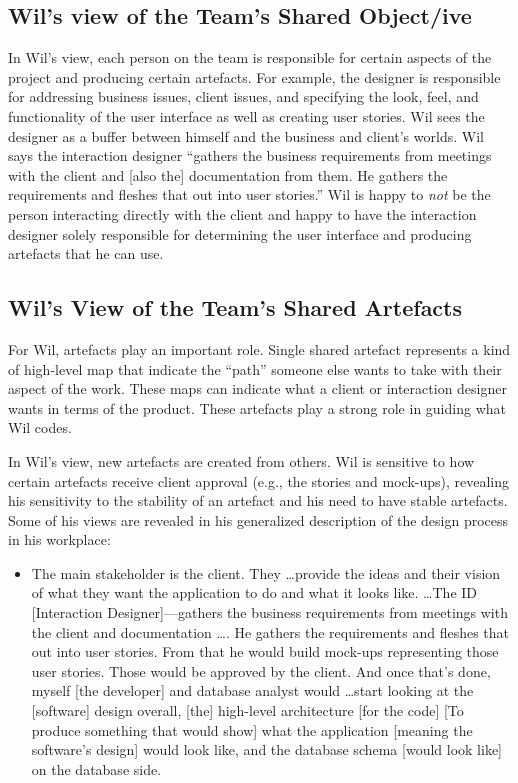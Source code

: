 \documentclass{chi2009}
\begin{document}
\subsection{Wil's view of the Team's Shared Object/ive} 
In Wil's view, each person on the team is responsible for certain aspects of the project and producing certain artefacts.  For example, the designer is responsible for addressing business issues, client issues, and specifying the look, feel, and functionality of the user interface as well as creating user stories. Wil sees the designer as a buffer between himself and the business and client's worlds. Wil says the interaction designer ``gathers the business requirements from meetings with the client and [also the] documentation from them. He gathers the requirements and fleshes that out into user stories.'' Wil is happy to {\it not} be the person interacting directly with the client and happy to have the interaction designer solely responsible for determining the user interface and producing artefacts that he can use. 

\subsection{Wil's View of the Team's Shared Artefacts} 
For Wil, artefacts play an important role. Single shared artefact represents a kind of high-level map that indicate the ``path'' someone else wants to take with their aspect of the work. These maps can indicate what a client or interaction designer wants in terms of the product. These artefacts play a strong role in guiding what Wil codes.  

In Wil's view, new artefacts are created from others. Wil is sensitive to how certain artefacts receive client approval (e.g., the stories and mock-ups), revealing his sensitivity to the stability of an artefact and his need to have stable artefacts. Some of his views are revealed in his generalized description of the design process in his workplace:

\begin{itemize}
\item [] The main stakeholder is the client. They \ldots provide the ideas and their vision of what they want the application to do and what it looks like. \ldots The ID [Interaction Designer]---gathers the business requirements from meetings with the client and documentation \dots. He gathers the requirements and fleshes that out into user stories. From that he would build mock-ups representing those user stories. Those would be approved by the client. And once that's done, myself [the developer] and database analyst would \ldots start looking at the [software] design overall, [the] high-level architecture [for the code] [To produce something that would show] what the application [meaning the software's design] would look like, and the database schema [would look like] on the database side. 
\end{itemize}
\end{document}
